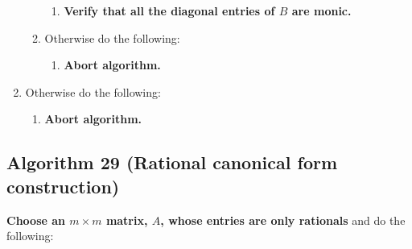 \documentclass[twocolumn]{article}
\begin{document}
\begin{enumerate}
\begin{enumerate}
\begin{enumerate}
						\item \textbf{Verify that all the diagonal entries of $B$ are monic.}
					\end{enumerate}
					\item Otherwise do the following:
					\begin{enumerate}
						\item \textbf{Abort algorithm.}
					\end{enumerate}
				\end{enumerate}
				\item Otherwise do the following:
				\begin{enumerate}
					\item \textbf{Abort algorithm.}
				\end{enumerate}
			\end{enumerate}
		\subsection{Algorithm 29 (Rational canonical form construction)}\label{sec:algorithm 29}
			\textbf{Choose an $m\times m$ matrix, $A$, whose entries are only rationals} and do the following:
\end{document}
